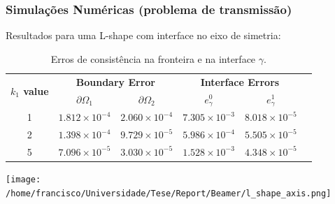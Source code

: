 \documentclass[portuguese,notheorems]{beamer}
\begin{document}
\begin{frame}\frametitle{Simulações Numéricas (problema de transmissão)}
    Resultados para uma L-shape com interface no eixo de simetria:
    \begin{table}
        \centering
        \scriptsize %
        \setlength{\tabcolsep}{2pt} %
        \begin{tabular}{cccccc}
            \toprule
            \multirow{2}{*}{\textbf{\(k_1\) value}} & \multicolumn{2}{c}{\textbf{Boundary Error}} & \multicolumn{2}{c}{\textbf{Interface Errors}} \\
            \cmidrule(lr){2-3} \cmidrule(lr){4-5}
            & \textbf{$\partial\Omega_1$} & \textbf{$\partial\Omega_2$} & \textbf{\(e_\gamma^0\)} & \textbf{\(e_\gamma^1\)} \\
            \midrule
            1 & $1.812\times10^{-4}$ & $2.060\times10^{-4}$ & $7.305\times10^{-3}$ & $8.018\times10^{-5}$ \\
            2 & $1.398\times10^{-4}$ & $9.729\times10^{-5}$ & $5.986\times10^{-4}$ & $5.505\times10^{-5}$ \\
            5 & $7.096\times10^{-5}$ & $3.030\times10^{-5}$ & $1.528\times10^{-3}$ & $4.348\times10^{-5}$ \\
            \bottomrule
        \end{tabular}
        \caption{Erros de consistência na fronteira e na interface \(\gamma\).}
        \label{tab:transmission_results_L_shape_axis}
    \end{table}
    \begin{minipage}{0.6\textwidth} %
        \centering
        \texttt{[image: /home/francisco/Universidade/Tese/Report/Beamer/l\_shape\_axis.png]}
    \end{minipage}%
    \begin{minipage}{0.4\textwidth} %
    \end{minipage}
\end{frame}
\end{document}

